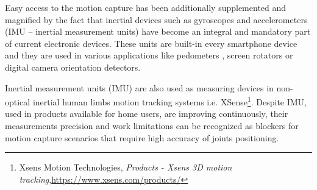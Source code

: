 \documentclass[sensors,article,submit,moreauthors,pdftex,10pt,a4paper]{mdpi}
\begin{document}
Easy access to the motion capture has been additionally supplemented and magnified by the fact that inertial devices such as gyroscopes and accelerometers (IMU – inertial measurement units) have become an integral and mandatory part of current electronic devices. These units are built-in every smartphone device and they are used in various applications like pedometers \cite{Huang2012, Jayalath2013}, screen rotators \cite{Pedley2013} or digital camera orientation detectors.

Inertial measurement units (IMU) are also used as measuring devices in non-optical inertial human limbs motion tracking systems i.e. XSense\footnote{Xsens Motion Technologies, \textit{Products - Xsens 3D motion tracking},\url{https://www.xsens.com/products/}}. Despite IMU, used in products available for home users, are improving continuously, their measurements precision and work limitations can be recognized as blockers for motion capture scenarios that require high accuracy of joints positioning.\\%
\end{document}
